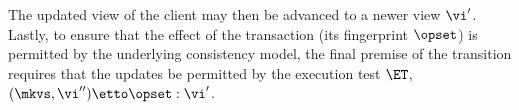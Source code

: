 The updated view of the client may then be advanced to a newer view $\vi'$.
Lastly, to ensure that the effect of the transaction (its fingerprint  $\opset$) is permitted by the underlying consistency model, 
the final premise of the transition requires that the updates be permitted by the execution test $\ET$, \ie \( (\mkvs, \vi'') \etto \opset : \vi'\).






